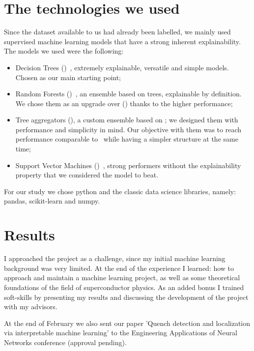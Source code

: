 \documentclass[a4paper, notitlepage]{article}
\begin{document}
\section{The technologies we used}
Since the dataset available to us had already been labelled, we mainly used supervised machine
learning models that have a strong inherent explainability. The models we used were the following:
\begin{itemize}
	\item Decision Trees (\dts)~\cite{breiman1984-dt}, extremely explainable, versatile and
	      simple models. Chosen as our main starting point;
	\item Random Forests (\rfs)~\cite{breiman2001-rf}, an ensemble based on trees, explainable by definition. We chose them as an upgrade over (\dts) thanks to the higher performance;
	\item Tree aggregators (\tas), a custom ensemble based on \dts; we designed them with
	      performance and simplicity in mind. Our objective with them was to reach performance
	      comparable to \rfs\ while having a simpler structure at the same time;
	\item Support Vector Machines (\svms)~\cite{cortes1995-svm}, strong performers without the
	      explainability property that we considered the model to beat.
\end{itemize}
For our study we chose python and the classic data science libraries, namely: pandas,
scikit-learn and numpy.

\section{Results}
I approached the project as a challenge, since my initial machine learning background was very
limited. At the end of the experience I learned: how to approach and maintain a machine learning
project, as well as some theoretical foundations of the field of superconductor physics. As an added
bonus I trained soft-skills by presenting my results and discussing the development of the project
with my advisors.

At the end of February we also sent our paper 'Quench detection and localization via
interpretable machine learning' to the Engineering Applications of Neural Networks conference
(approval pending).
\end{document}
